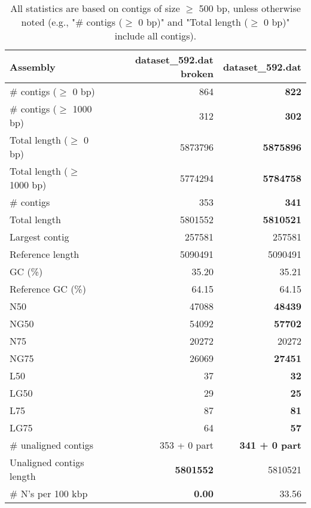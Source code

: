 \documentclass[12pt,a4paper]{article}
\begin{document}
\begin{table}[ht]
\begin{center}
\caption{All statistics are based on contigs of size $\geq$ 500 bp, unless otherwise noted (e.g., "\# contigs ($\geq$ 0 bp)" and "Total length ($\geq$ 0 bp)" include all contigs).}
\begin{tabular}{|l*{2}{|r}|}
\hline
Assembly & dataset\_592.dat broken & dataset\_592.dat \\ \hline
\# contigs ($\geq$ 0 bp) & 864 & {\bf 822} \\ \hline
\# contigs ($\geq$ 1000 bp) & 312 & {\bf 302} \\ \hline
Total length ($\geq$ 0 bp) & 5873796 & {\bf 5875896} \\ \hline
Total length ($\geq$ 1000 bp) & 5774294 & {\bf 5784758} \\ \hline
\# contigs & 353 & {\bf 341} \\ \hline
Total length & 5801552 & {\bf 5810521} \\ \hline
Largest contig & 257581 & 257581 \\ \hline
Reference length & 5090491 & 5090491 \\ \hline
GC (\%) & 35.20 & 35.21 \\ \hline
Reference GC (\%) & 64.15 & 64.15 \\ \hline
N50 & 47088 & {\bf 48439} \\ \hline
NG50 & 54092 & {\bf 57702} \\ \hline
N75 & 20272 & 20272 \\ \hline
NG75 & 26069 & {\bf 27451} \\ \hline
L50 & 37 & {\bf 32} \\ \hline
LG50 & 29 & {\bf 25} \\ \hline
L75 & 87 & {\bf 81} \\ \hline
LG75 & 64 & {\bf 57} \\ \hline
\# unaligned contigs & 353 + 0 part & {\bf 341 + 0 part} \\ \hline
Unaligned contigs length & {\bf 5801552} & 5810521 \\ \hline
\# N's per 100 kbp & {\bf 0.00} & 33.56 \\ \hline
\end{tabular}
\end{center}
\end{table}
\end{document}

